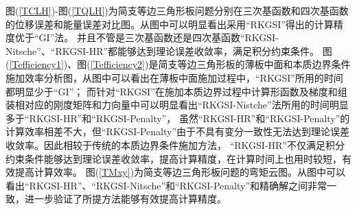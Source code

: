 图(\ref{TCLH})-图(\ref{TQLH})为简支等边三角形板问题分别在三次基函数和四次基函数的位移误差和能量误差对比图。从图中可以明显看出采用“RKGSI”得出的计算精度优于“GI”法。
并且不管是三次基函数还是四次基函数“RKGSI-Nitsche”、“RKGSI-HR”都能够达到理论误差收敛率，满足积分约束条件。
图(\ref{Tefficiency1})、图(\ref{Tefficiency2})是简支等边三角形板的薄板中面和本质边界条件施加效率分析图，从图中可以看出在薄板中面施加过程中，“RKGSI”所用的时间都明显少于“GI”；
而针对“RKGSI”在施加本质边界过程中计算形函数及梯度和组装相对应的刚度矩阵和力向量中可以明显看出“RKGSI-Nistche”法所用的时间明显多于“RKGSI-HR”和“RKGSI-Penalty”，
虽然“RKGSI-HR”和“RKGSI-Penalty”的计算效率相差不大，但“RKGSI-Penalty”由于不具有变分一致性无法达到理论误差收敛率。因此相较于传统的本质边界条件施加方法，
“RKGSI-HR”不仅满足积分约束条件能够达到理论误差收敛率，提高计算精度，在计算时间上也用时较短，有效提高计算效率。
图(\ref{TMxy})为简支等边三角形板问题的弯矩云图。从图中可以看出“RKGSI-HR”、“RKGSI-Nitsche”和“RKGSI-Penalty”和精确解之间非常一致，进一步验证了所提方法能够有效提高计算精度。
